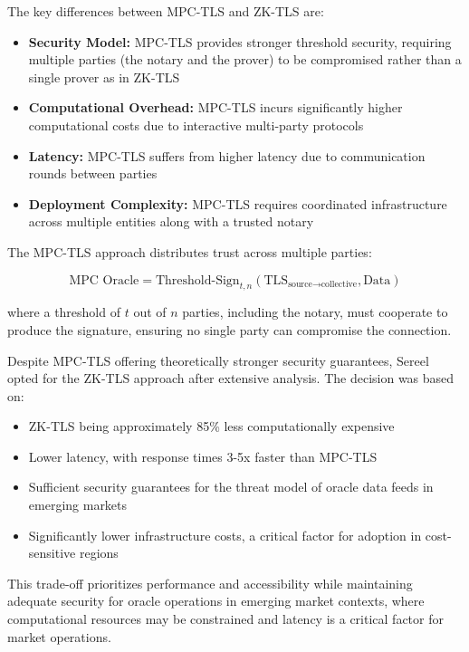 \documentclass[12pt]{article}
\begin{document}
The key differences between MPC-TLS and ZK-TLS are:

\begin{itemize}
  \item \textbf{Security Model:} MPC-TLS provides stronger threshold security, requiring multiple parties (the notary and the prover) to be compromised rather than a single prover as in ZK-TLS
  \item \textbf{Computational Overhead:} MPC-TLS incurs significantly higher computational costs due to interactive multi-party protocols
  \item \textbf{Latency:} MPC-TLS suffers from higher latency due to communication rounds between parties
  \item \textbf{Deployment Complexity:} MPC-TLS requires coordinated infrastructure across multiple entities along with a trusted notary
\end{itemize}

The MPC-TLS approach distributes trust across multiple parties:

\begin{equation}
\text{MPC Oracle} = \text{Threshold-Sign}_{t,n}(\text{TLS}_{\text{source} \rightarrow \text{collective}}, \text{Data})
\end{equation}

where a threshold of $t$ out of $n$ parties, including the notary, must cooperate to produce the signature, ensuring no single party can compromise the connection.

Despite MPC-TLS offering theoretically stronger security guarantees, Sereel opted for the ZK-TLS approach after extensive analysis. The decision was based on:

\begin{itemize}
  \item ZK-TLS being approximately 85\% less computationally expensive
  \item Lower latency, with response times 3-5x faster than MPC-TLS
  \item Sufficient security guarantees for the threat model of oracle data feeds in emerging markets
  \item Significantly lower infrastructure costs, a critical factor for adoption in cost-sensitive regions
\end{itemize}

This trade-off prioritizes performance and accessibility while maintaining adequate security for oracle operations in emerging market contexts, where computational resources may be constrained and latency is a critical factor for market operations.
\end{document}
